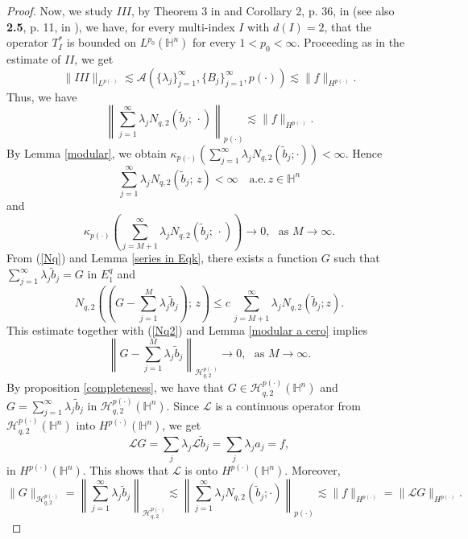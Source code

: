 \documentclass[oneside,10pt]{article}
\begin{document}
\begin{proof}
Now, we study $III$, by Theorem 3 in \cite{Folland} and Corollary 2, p. 36, in \cite{Elias} (see also {\bf 2.5}, p. 11, in \cite{Elias}), 
we have, for every multi-index $I$ with $d(I) = 2$, that the operator $T_{I}^{*}$ is bounded on $L^{p_0}(\mathbb{H}^n)$ for every 
$1 < p_0 < \infty$. Proceeding as in the estimate of $II$, we get
\[
\| III\|_{L^{p(\cdot)}} \lesssim \mathcal{A}\left( \{ \lambda_j \}_{j=1}^{\infty}, \{ B_j \}_{j=1}^{\infty}, p(\cdot) \right) 
\lesssim \| f \|_{H^{p(\cdot)}}.
\]
Thus, we have
$$\left\| \sum_{j=1}^{\infty} \lambda_j N_{q, 2}(\widetilde{b}_j; \, \cdot) \right\|_{p(\cdot)} \lesssim \|f \|_{H^{p(\cdot)}}.$$
By Lemma \ref{modular}, we obtain $\kappa_{p(\cdot)}\left( \sum_{j=1}^{\infty} \lambda_j N_{q, 2}(\widetilde{b}_j; \cdot) \right) < \infty$. Hence
\begin{equation}
\sum_{j=1}^{\infty} \lambda_j N_{q, 2}(\widetilde{b}_j; \, z) < \infty \,\,\,\,\,\, \text{a.e.} \, z \in \mathbb{H}^{n} \label{Nq}
\end{equation}
and
\begin{equation}
\kappa_{p(\cdot)}\left( \sum_{j=M+1}^{\infty} \lambda_j N_{q, 2}(\widetilde{b}_j; \, \cdot) \right) \rightarrow 0, \,\,\,\, \text{as} \,\,  M \rightarrow \infty  \label{Nq2}.
\end{equation}
From (\ref{Nq}) and Lemma \ref{series in Eqk}, there exists a function $G$ such that $\sum_{j=1}^{\infty} \lambda_j \widetilde{b}_j = G$ 
in $E^{q}_{1}$ and
\[
N_{q, 2} \left( \left(G - \sum_{j=1}^{M} \lambda_j \widetilde{b}_j \right) ; \, z \right) \leq c \, 
\sum_{j=M+1}^{\infty} \lambda_j N_{q, 2}(\widetilde{b}_j; z).
\]
This estimate together with (\ref{Nq2}) and Lemma \ref{modular a cero} implies
\[
\left\| G - \sum_{j=1}^{M} \lambda_j \widetilde{b}_j \right\|_{\mathcal{H}^{p(\cdot)}_{q,2}} \rightarrow 0, \,\,\,\, \text{as} \,\,  M \rightarrow \infty.
\]
By proposition \ref{completeness}, we have that $G \in \mathcal{H}^{p(\cdot)}_{q,2}(\mathbb{H}^{n})$ and 
$G = \sum_{j=1}^{\infty} \lambda_j \widetilde{b}_j$ in $\mathcal{H}^{p(\cdot)}_{q,2}(\mathbb{H}^{n})$. Since $\mathcal{L}$ is a continuous operator from $\mathcal{H}^{p(\cdot)}_{q,2}(\mathbb{H}^{n})$ into $H^{p(\cdot)}(\mathbb{H}^{n})$, we get
\[
\mathcal{L}G = \sum_j \lambda_j \mathcal{L} \widetilde{b}_j = \sum_j \lambda_j a_j = f,
\]
in $H^{p(\cdot)}(\mathbb{H}^{n})$. This shows that $\mathcal{L}$ is onto $H^{p(\cdot)}(\mathbb{H}^{n})$. Moreover,
\[
\| G\|_{\mathcal{H}^{p(\cdot)}_{q,2}} = \left\| \sum_{j=1}^{\infty} \lambda_j \widetilde{b}_j \right\|_{\mathcal{H}^{p(\cdot)}_{q,2}} \lesssim \left\| \sum_{j=1}^{\infty} \lambda_j N_{q, 2}(\widetilde{b}_j; \cdot) \right\|_{p(\cdot)} \lesssim \|f \|_{H^{p(\cdot)}} = \| \mathcal{L} G \|_{H^{p(\cdot)}}.
\]
\end{proof}
\end{document}
